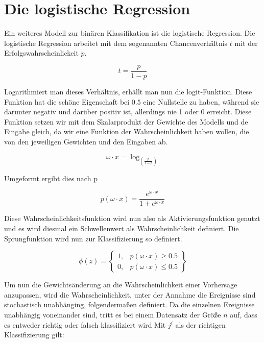 \documentclass[11pt]{article} %
\begin{document}
\section{Die logistische Regression}
Ein weiteres Modell zur binären Klassifikation ist die logistische Regression. Die logistische Regression arbeitet mit dem sogenannten 
Chancenverhältnis $t$ mit der Erfolgswahrscheinlickeit $p$. 

\begin{equation}
t = \frac{p}{1-p}
\end{equation}

Logarithmiert man dieses Verhältnis, erhällt man nun die logit-Funktion. Diese Funktion hat die schöne Eigenschaft bei $0.5$ eine Nullstelle
zu haben, während sie darunter negativ und darüber positiv ist, allerdings nie 1 oder 0 erreicht. Diese Funktion setzen wir mit dem Skalarprodukt 
der Gewichte des Modells und de Eingabe gleich, da wir eine Funktion der Wahrscheinlichkeit haben wollen, die von den jeweiligen Gewichten
und den Eingaben ab.

\begin{equation}
\omega \cdot x = \log_{(\frac{p}{1-p})}
\end{equation} 

Umgeformt ergibt dies nach p

\begin{equation}
p(\omega \cdot x) = \frac{e^{\omega \cdot x}}{1+e^{\omega \cdot x}}
\end{equation} 

Diese Wahrscheinlichkeitsfunktion wird nun also als Aktivierungsfunktion genutzt und es wird diesmal ein Schwellenwert als Wahrscheinlichkeit 
definiert. Die Sprungfunktion wird nun zur Klassifizierung so definiert.

\begin{equation}
\phi(z) =  \begin{Bmatrix}
1, &  p(\omega \cdot x) \geq 0.5  \\
0, & p(\omega \cdot x) \leq 0.5 
\end{Bmatrix} 
\end{equation}

Um nun die Gewichtsänderung an die Wahrscheinlichkeit einer Vorhersage anzupassen, wird die Wahrscheinlichkeit, unter der Annahme die Ereignisse sind stochastisch unabhänging, folgendermaßen definiert. Da die einzelnen Ereignisse unabhängig voneinander sind, tritt
es bei einem Datensatz der Größe $n$ auf, dass es entweder richtig oder falsch klassifiziert wird Mit  $j^i$ als der richtigen Klassifizierung gilt:
\end{document}
